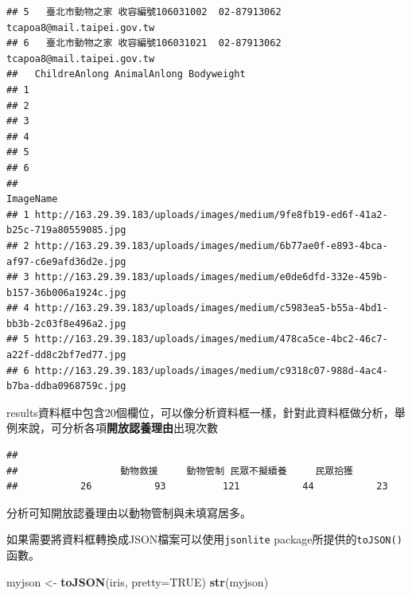 \documentclass[]{book}
\newenvironment{Shaded}{\begin{snugshade}}{\end{snugshade}}
\newcommand{\KeywordTok}[1]{\textcolor[rgb]{0.13,0.29,0.53}{\textbf{{#1}}}}
\newcommand{\DataTypeTok}[1]{\textcolor[rgb]{0.13,0.29,0.53}{{#1}}}
\newcommand{\StringTok}[1]{\textcolor[rgb]{0.31,0.60,0.02}{{#1}}}
\newcommand{\OtherTok}[1]{\textcolor[rgb]{0.56,0.35,0.01}{{#1}}}
\newcommand{\NormalTok}[1]{{#1}}
\theoremstyle{definition}
\theoremstyle{definition}
\theoremstyle{remark}
\begin{document}
\begin{verbatim}
## 5   臺北市動物之家 收容編號106031002  02-87913062 tcapoa8@mail.taipei.gov.tw
## 6   臺北市動物之家 收容編號106031021  02-87913062 tcapoa8@mail.taipei.gov.tw
##   ChildreAnlong AnimalAnlong Bodyweight
## 1                                      
## 2                                      
## 3                                      
## 4                                      
## 5                                      
## 6                                      
##                                                                             ImageName
## 1 http://163.29.39.183/uploads/images/medium/9fe8fb19-ed6f-41a2-b25c-719a80559085.jpg
## 2 http://163.29.39.183/uploads/images/medium/6b77ae0f-e893-4bca-af97-c6e9afd36d2e.jpg
## 3 http://163.29.39.183/uploads/images/medium/e0de6dfd-332e-459b-b157-36b006a1924c.jpg
## 4 http://163.29.39.183/uploads/images/medium/c5983ea5-b55a-4bd1-bb3b-2c03f8e496a2.jpg
## 5 http://163.29.39.183/uploads/images/medium/478ca5ce-4bc2-46c7-a22f-dd8c2bf7ed77.jpg
## 6 http://163.29.39.183/uploads/images/medium/c9318c07-988d-4ac4-b7ba-ddba0968759c.jpg
\end{verbatim}

results資料框中包含20個欄位，可以像分析資料框一樣，針對此資料框做分析，舉例來說，可分析各項\textbf{開放認養理由}出現次數

\begin{Shaded}
\end{Shaded}

\begin{verbatim}
## 
##                  動物救援     動物管制 民眾不擬續養     民眾拾獲 
##           26           93          121           44           23
\end{verbatim}

分析可知開放認養理由以動物管制與未填寫居多。

如果需要將資料框轉換成JSON檔案可以使用\texttt{jsonlite}
package所提供的\texttt{toJSON()}函數。

\begin{Shaded}
\begin{Highlighting}[]
\NormalTok{myjson <-}\StringTok{ }\KeywordTok{toJSON}\NormalTok{(iris, }\DataTypeTok{pretty=}\OtherTok{TRUE}\NormalTok{)}
\KeywordTok{str}\NormalTok{(myjson)}
\end{Highlighting}
\end{Shaded}
\end{document}
